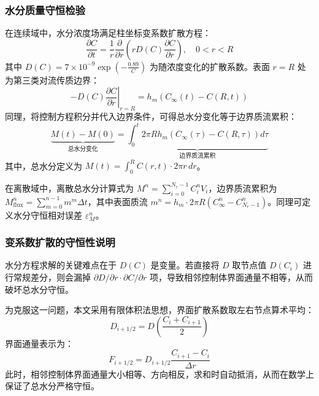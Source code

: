 \documentclass[withoutpreface,bwprint]{cumcm_thesis}
\begin{document}
\subsubsection{水分质量守恒检验}

在连续域中，水分浓度场满足柱坐标变系数扩散方程：
\begin{equation}
\frac{\partial C}{\partial t} = \frac{1}{r} \frac{\partial}{\partial r} \left( r D(C) \frac{\partial C}{\partial r} \right), \quad 0 < r < R
\end{equation}
其中 \(D(C) = 7 \times 10^{-9} \exp\left(-\frac{0.89}{C}\right)\) 为随浓度变化的扩散系数。表面 \(r=R\) 处为第三类对流传质边界：
\begin{equation}
-D(C) \left. \frac{\partial C}{\partial r} \right|_{r=R} = h_m \left( C_\infty(t) - C(R,t) \right)
\end{equation}
同理，将控制方程积分并代入边界条件，可得总水分变化等于边界质流累积：
\begin{equation}
\underbrace{M(t) - M(0)}_{\text{总水分变化}} = \underbrace{\int_0^t 2\pi R h_m \left( C_\infty(\tau) - C(R,\tau) \right) d\tau}_{\text{边界质流累积}}
\end{equation}
其中，总水分定义为 \(M(t) = \int_0^R C(r,t) \cdot 2\pi r \, dr\)。

在离散域中，离散总水分计算式为 \(M^n = \sum_{i=0}^{N_r-1} C_i^n V_i\)，边界质流累积为 \(M_{\text{flux}}^n = \sum_{m=0}^{n-1} m^m \Delta t\)，其中表面质流 \(m^n = h_m \cdot 2\pi R \left( C_\infty^n - C_{N_r-1}^n \right)\)。同理可定义水分守恒相对误差 \(\varepsilon_M^n\)。

\subsubsection{变系数扩散的守恒性说明}

水分方程求解的关键难点在于 \(D(C)\) 是变量。若直接将 \(D\) 取节点值 \(D(C_i)\) 进行常规差分，则会漏掉 \(\partial D / \partial r \cdot \partial C / \partial r\) 项，导致相邻控制体界面通量不相等，从而破坏总水分守恒。

为克服这一问题，本文采用有限体积法思想，界面扩散系数取左右节点算术平均：
\begin{equation}
D_{i+1/2} = D\left( \frac{C_i + C_{i+1}}{2} \right)
\end{equation}
界面通量表示为：
\begin{equation}
F_{i+1/2} = D_{i+1/2} \frac{C_{i+1} - C_i}{\Delta r}
\end{equation}
此时，相邻控制体界面通量大小相等、方向相反，求和时自动抵消，从而在数学上保证了总水分严格守恒。
\end{document}
